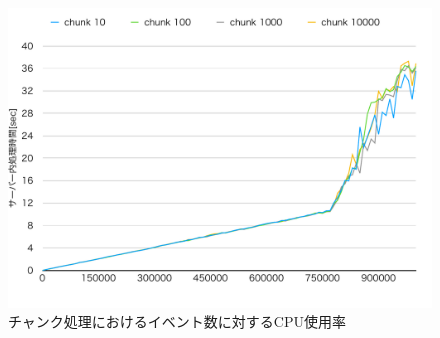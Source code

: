 \documentclass[../../../../../main]{subfiles}
\begin{document}
    \begin{figure}[H]
        \centering
        \includegraphics[width=12cm]{graph}
        \caption{チャンク処理におけるイベント数に対するCPU使用率}
        \label{fig:chunk-cpu-app_1_1024-db_1_1024}
    \end{figure}
\end{document}
